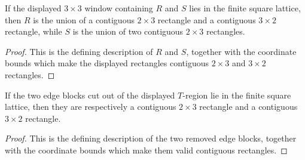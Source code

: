 \begin{lemma}%
    \label{lem:peps_normalSquareRegionRS_rectangular_decomposition}
    \leanok
    If the displayed $3\times3$ window containing $R$ and $S$ lies in
    the finite square lattice, then $R$ is the union of a contiguous
    $2\times3$ rectangle and a contiguous $3\times2$ rectangle, while
    $S$ is the union of two contiguous $2\times3$ rectangles.
\end{lemma}
\begin{proof}\leanok
    This is the defining description of $R$ and $S$, together with the
    coordinate bounds which make the displayed rectangles contiguous
    $2\times3$ and $3\times2$ rectangles.
\end{proof}

\begin{lemma}%
    \label{lem:peps_normalSquareRegionTHole_rectangular_decomposition}
    \leanok
    If the two edge blocks cut out of the displayed $T$-region lie in the
    finite square lattice, then they are respectively a contiguous
    $2\times3$ rectangle and a contiguous $3\times2$ rectangle.
\end{lemma}
\begin{proof}\leanok
    This is the defining description of the two removed edge blocks, together
    with the coordinate bounds which make them valid contiguous rectangles.
\end{proof}

